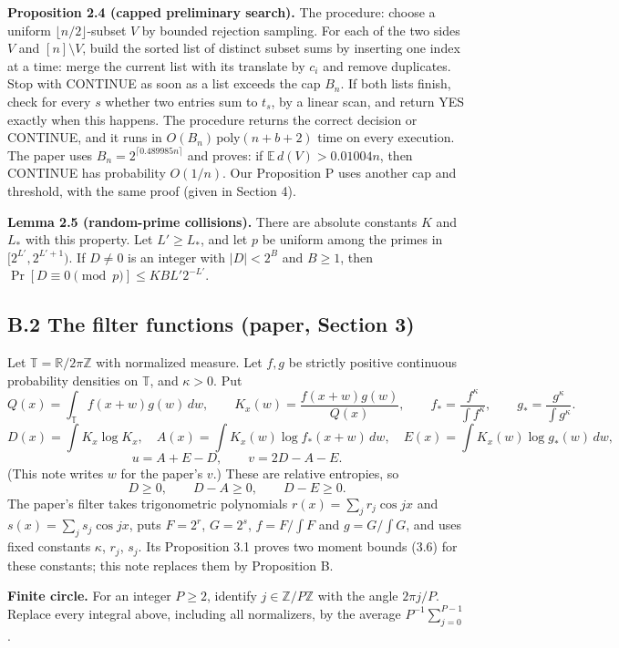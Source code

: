 \documentclass[10pt,a4paper]{article}
\begin{document}
\textbf{Proposition 2.4 (capped preliminary search).} The procedure: choose a uniform $\lfloor n/2\rfloor$-subset $V$ by
bounded rejection sampling. For each of the two sides $V$ and $[n]\setminus V$, build the sorted list of distinct subset
sums by inserting one index at a time: merge the current list with its translate by $c_i$ and remove duplicates. Stop
with CONTINUE as soon as a list exceeds the cap $B_n$. If both lists finish, check for every $s$ whether two entries sum
to $t_s$, by a linear scan, and return YES exactly when this happens. The procedure returns the correct decision or
CONTINUE, and it runs in $O(B_n)\,\mathrm{poly}(n + b + 2)$ time on every execution. The paper uses
$B_n = 2^{\lceil 0.489985n\rceil}$ and proves: if $\mathbb E\,d(V) > 0.01004n$, then CONTINUE has probability $O(1/n)$.
Our Proposition P uses another cap and threshold, with the same proof (given in Section 4).

\textbf{Lemma 2.5 (random-prime collisions).} There are absolute constants $K$ and $L_*$ with this property. Let $L' \ge L_*$,
and let $p$ be uniform among the primes in $[2^{L'}, 2^{L'+1})$. If $D \ne 0$ is an integer with $|D| < 2^B$ and
$B \ge 1$, then $\Pr[D \equiv 0 \pmod p] \le KBL'2^{-L'}$.

\subsection*{B.2 The filter functions (paper, Section 3)}

Let $\mathbb T = \mathbb R/2\pi\mathbb Z$ with normalized measure. Let $f, g$ be strictly positive continuous probability
densities on $\mathbb T$, and $\kappa > 0$. Put
\[Q(x) = \int_{\mathbb T}f(x+w)g(w)\,dw,\qquad K_x(w) = \frac{f(x+w)g(w)}{Q(x)},\qquad
f_* = \frac{f^\kappa}{\int f^\kappa},\qquad g_* = \frac{g^\kappa}{\int g^\kappa}. \tag{3.1}\]
\[D(x) = \int K_x\log K_x,\quad A(x) = \int K_x(w)\log f_*(x+w)\,dw,\quad E(x) = \int K_x(w)\log g_*(w)\,dw,\]
\[u = A + E - D,\qquad v = 2D - A - E. \tag{3.2}\]
(This note writes $w$ for the paper's $v$.) These are relative entropies, so
\[D \ge 0,\qquad D - A \ge 0,\qquad D - E \ge 0. \tag{3.3}\]
The paper's filter takes trigonometric polynomials $r(x) = \sum_j r_j\cos jx$ and $s(x) = \sum_j s_j\cos jx$, puts
$F = 2^r$, $G = 2^s$, $f = F/\int F$ and $g = G/\int G$, and uses fixed constants $\kappa$, $r_j$, $s_j$. Its
Proposition 3.1 proves two moment bounds (3.6) for these constants; this note replaces them by Proposition B.

\textbf{Finite circle.} For an integer $P \ge 2$, identify $j \in \mathbb Z/P\mathbb Z$ with the angle $2\pi j/P$. Replace
every integral above, including all normalizers, by the average $P^{-1}\sum_{j=0}^{P-1}$.
\end{document}
